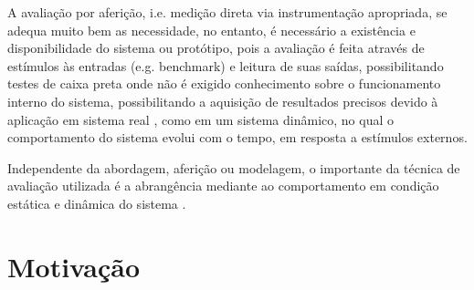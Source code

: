 A avaliação por aferição, i.e. medição direta via instrumentação apropriada, se adequa muito bem as necessidade, no entanto, é necessário a existência e disponibilidade do sistema ou protótipo, pois a avaliação é feita através de estímulos às entradas (e.g. benchmark) e leitura de suas saídas, possibilitando testes de caixa preta onde não é exigido conhecimento sobre o funcionamento interno do sistema, possibilitando a aquisição de resultados precisos devido à aplicação em sistema real \cite{Nobile2013}, como em um sistema dinâmico, no qual o comportamento do sistema evolui com o tempo, em resposta a estímulos externos.




Independente da abordagem, aferição ou modelagem, o importante da técnica de avaliação utilizada é a abrangência mediante ao comportamento em condição estática e dinâmica do sistema \cite{helder2014}.


\section{Motivação}

